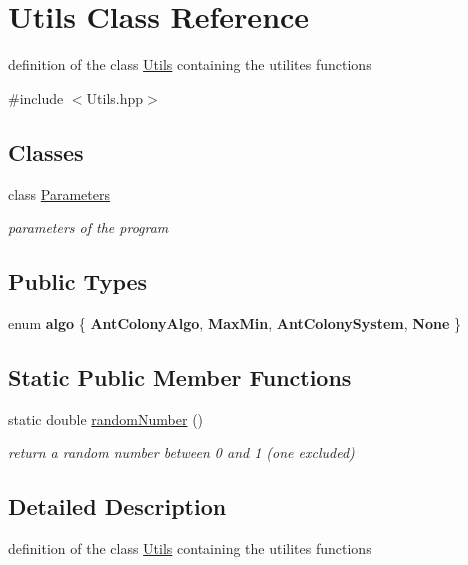 \hypertarget{classUtils}{}\section{Utils Class Reference}
\label{classUtils}


definition of the class \hyperlink{classUtils}{Utils} containing the utilites functions  




{\ttfamily \#include $<$Utils.\+hpp$>$}

\subsection*{Classes}
\begin{DoxyCompactItemize}
\item 
class \hyperlink{classUtils_1_1Parameters}{Parameters}
\begin{DoxyCompactList}\small\item\em parameters of the program \end{DoxyCompactList}\end{DoxyCompactItemize}
\subsection*{Public Types}
\begin{DoxyCompactItemize}
\item 
enum {\bfseries algo} \{ {\bfseries Ant\+Colony\+Algo}, 
{\bfseries Max\+Min}, 
{\bfseries Ant\+Colony\+System}, 
{\bfseries None}
 \}\hypertarget{classUtils_a76d79276f3716eb2b6f5d0cc1549aee2}{}\label{classUtils_a76d79276f3716eb2b6f5d0cc1549aee2}

\end{DoxyCompactItemize}
\subsection*{Static Public Member Functions}
\begin{DoxyCompactItemize}
\item 
static double \hyperlink{classUtils_a53886f9ffe8a1a47261a2c712aeec7d5}{random\+Number} ()
\begin{DoxyCompactList}\small\item\em return a random number between 0 and 1 (one excluded) \end{DoxyCompactList}\end{DoxyCompactItemize}


\subsection{Detailed Description}
definition of the class \hyperlink{classUtils}{Utils} containing the utilites functions 

